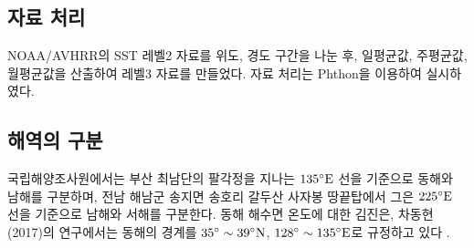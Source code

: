 \newpage
\subsection{자료 처리}

NOAA/AVHRR의 SST 레벨2 자료를 위도, 경도 구간을 나눈 후, 일평균값, 주평균값, 월평균값을 산출하여 레벨3 자료를 만들었다. 자료 처리는 Phthon을 이용하여 실시하였다. 

\subsection{해역의 구분}

국립해양조사원에서는 부산 최남단의 팔각정을 지나는 $135 \rm{{^\circ} E}$ 선을 기준으로 동해와 남해를 구분하며, 전남 해남군 송지면 송호리 갈두산 사자봉 땅끝탑에서 그은 $225 \rm{{^\circ} E}$ 선을 기준으로 남해와 서해를 구분한다. 동해 해수면 온도에 대한 김진은, 차동현(2017)의 연구에서는 동해의 경계를 $35 {^\circ} \sim 39 \rm{{^\circ} N}$, $128 \rm{{^\circ}} \sim 135 \rm{{^\circ} E}$로 규정하고 있다 \cite{김진은2017영동}. 


